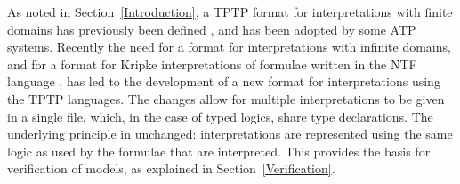 \documentclass[letterpaper]{article}
\begin{document}
As noted in Section~\ref{Introduction}, a TPTP format for interpretations with finite domains 
has previously been defined \cite{SS+06}, and has been adopted by some ATP systems.
Recently the need for a format for interpretations with infinite domains, and for a format for 
Kripke interpretations \cite{Kri63} of formulae written in the NTF language \cite{SF+22}, has 
led to the development of a new format for interpretations using the TPTP languages.
The changes allow for multiple interpretations to be given in a single file, which, in the case
of typed logics, share type declarations.
The underlying principle in unchanged: interpretations are represented using the same logic
as used by the formulae that are interpreted.
This provides the basis for verification of models, as explained in Section~\ref{Verification}.
\end{document}
